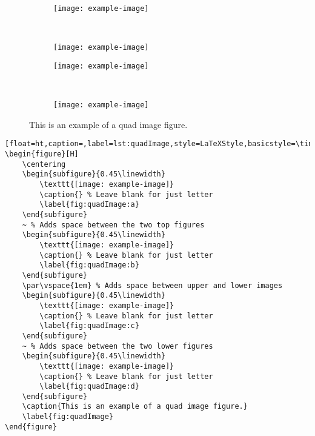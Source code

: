 		\vspace*{\fill}
		\pagebreak



		\vspace*{\fill}
		\begin{figure}[H]
			\centering
			\begin{subfigure}{0.45\linewidth}
				\texttt{[image: example-image]}
				\caption{} %
				\label{fig:quadImage:a}
			\end{subfigure}
			~ %
			\begin{subfigure}{0.45\linewidth}
				\texttt{[image: example-image]}
				\caption{} %
				\label{fig:quadImage:b}
			\end{subfigure}
			\par\vspace{1em} %
			\begin{subfigure}{0.45\linewidth}
				\texttt{[image: example-image]}
				\caption{} %
				\label{fig:quadImage:c}
			\end{subfigure}
			~ %
			\begin{subfigure}{0.45\linewidth}
				\texttt{[image: example-image]}
				\caption{} %
				\label{fig:quadImage:d}
			\end{subfigure}
			\caption{This is an example of a quad image figure.}
			\label{fig:quadImage}
		\end{figure}
		\begin{lstlisting}[float=ht,caption=,label=lst:quadImage,style=LaTeXStyle,basicstyle=\tiny\ttfamily,]
\begin{figure}[H]
	\centering
	\begin{subfigure}{0.45\linewidth}
		\texttt{[image: example-image]}
		\caption{} % Leave blank for just letter
		\label{fig:quadImage:a}
	\end{subfigure}
	~ % Adds space between the two top figures
	\begin{subfigure}{0.45\linewidth}
		\texttt{[image: example-image]}
		\caption{} % Leave blank for just letter
		\label{fig:quadImage:b}
	\end{subfigure}
	\par\vspace{1em} % Adds space between upper and lower images
	\begin{subfigure}{0.45\linewidth}
		\texttt{[image: example-image]}
		\caption{} % Leave blank for just letter
		\label{fig:quadImage:c}
	\end{subfigure}
	~ % Adds space between the two lower figures
	\begin{subfigure}{0.45\linewidth}
		\texttt{[image: example-image]}
		\caption{} % Leave blank for just letter
		\label{fig:quadImage:d}
	\end{subfigure}
	\caption{This is an example of a quad image figure.}
	\label{fig:quadImage}
\end{figure}
		\end{lstlisting}
		\vspace*{\fill}
		\pagebreak
